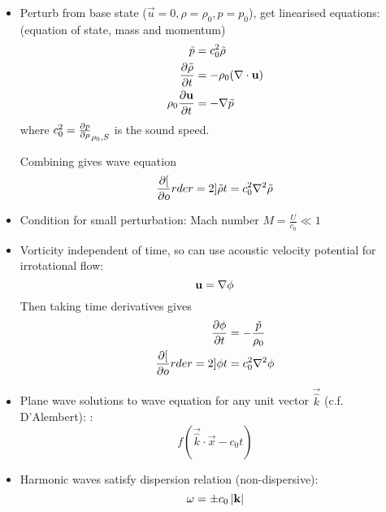 \begin{itemize}
    \item 
    Perturb from base state ($\vec{u} = 0, \rho = \rho_0, p=p_0$), get linearised equations: (equation of state, mass and momentum)
    \begin{align*}
        \tilde{p} &= c_0^2 \tilde{\rho}\\
        \frac{\partial{\tilde{\rho}}}{\partial{t}} &= - \rho_0 (\nabla\cdot\boldsymbol{\mathbf{u}}) \\
        \rho_0 \frac{\partial{\boldsymbol{\mathbf{u}}}}{\partial{t}} &= -\mathbf{\nabla} \tilde{p}
    \end{align*}
    where $c_0^2 = \frac{\partial{p}}{\partial{\rho}}_{\rho_0,S}$ is the sound speed. 
    
    Combining gives wave equation \[ \frac{\partial{[}}{\partial{o}}rder=2]{\tilde{\rho}}{t} = c_0^2 \nabla^2 \tilde{\rho} \]
    
    \item Condition for small perturbation: Mach number $M = \frac{U}{c_0} \ll 1$

    \item Vorticity independent of time, so can use acoustic velocity potential for irrotational flow: \[\boldsymbol{\mathbf{u}} = \mathbf{\nabla} \phi\]
    Then taking time derivatives gives 
    \begin{align*}
        \frac{\partial{\phi}}{\partial{t}} &= -\frac{\tilde{p}}{\rho_0} \\
        \frac{\partial{[}}{\partial{o}}rder=2]{\phi}{t} &= c_0^2 \nabla^2 \phi
    \end{align*}
    \item Plane wave solutions to wave equation for any unit vector $\vec{\hat{k}}$ (c.f. D'Alembert): : \[f(\vec{\hat{k}} \cdot \vec{x} -c_0 t)\]
    \item Harmonic waves satisfy dispersion relation (non-dispersive): \[\omega = \pm c_0 \left| \boldsymbol{\mathbf{k}} \right|\]
\end{itemize}
